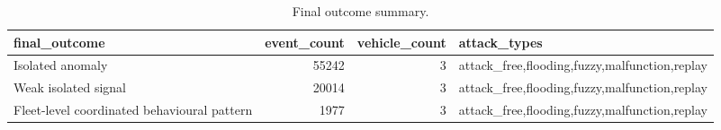 \begin{table}[t]
\centering
\begin{tabular}{lrrl}
\toprule
final\_outcome & event\_count & vehicle\_count & attack\_types \\
\midrule
Isolated anomaly & 55242 & 3 & attack\_free,flooding,fuzzy,malfunction,replay \\
Weak isolated signal & 20014 & 3 & attack\_free,flooding,fuzzy,malfunction,replay \\
Fleet-level coordinated behavioural pattern & 1977 & 3 & attack\_free,flooding,fuzzy,malfunction,replay \\
\bottomrule
\end{tabular}
\caption{Final outcome summary.}
\label{tab:final-outcomes}
\end{table}
